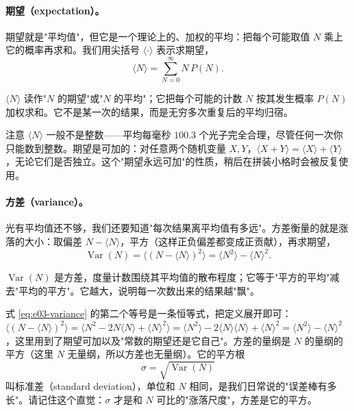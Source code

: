 \paragraph{期望（expectation）。}
期望就是"平均值"，但它是一个理论上的、加权的平均：把每个可能取值 $N$ 乘上它的概率再求和。我们用尖括号 $\langle\cdot\rangle$ 表示求期望，
\begin{equation}
  \langle N\rangle=\sum_{N=0}^{\infty}N\,P(N).
  \label{eq:e03-expectation}
\end{equation}
\begin{formulaexplain}
$\langle N\rangle$ 读作"$N$ 的期望"或"$N$ 的平均"；它把每个可能的计数 $N$ 按其发生概率 $P(N)$ 加权求和。它不是某一次的结果，而是无穷多次重复后的平均归宿。
\end{formulaexplain}
注意 $\langle N\rangle$ 一般不是整数——平均每毫秒 $100.3$ 个光子完全合理，尽管任何一次你只能数到整数。期望是可加的：对任意两个随机变量 $X,Y$，$\langle X+Y\rangle=\langle X\rangle+\langle Y\rangle$，无论它们是否独立。这个"期望永远可加"的性质，稍后在拼装小格时会被反复使用。

\paragraph{方差（variance）。}
光有平均值还不够，我们还要知道"每次结果离平均值有多远"。方差衡量的就是涨落的大小：取偏差 $N-\langle N\rangle$，平方（这样正负偏差都变成正贡献），再求期望，
\begin{equation}
  \operatorname{Var}(N)=\big\langle (N-\langle N\rangle)^2\big\rangle
  =\langle N^2\rangle-\langle N\rangle^2 .
  \label{eq:e03-variance}
\end{equation}
\begin{formulaexplain}
$\operatorname{Var}(N)$ 是方差，度量计数围绕其平均值的散布程度；它等于"平方的平均"减去"平均的平方"。它越大，说明每一次数出来的结果越"飘"。
\end{formulaexplain}
式 \eqref{eq:e03-variance} 的第二个等号是一条恒等式，把定义展开即可：$\langle(N-\langle N\rangle)^2\rangle=\langle N^2-2N\langle N\rangle+\langle N\rangle^2\rangle=\langle N^2\rangle-2\langle N\rangle\langle N\rangle+\langle N\rangle^2=\langle N^2\rangle-\langle N\rangle^2$，这里用到了期望可加以及"常数的期望还是它自己"。方差的量纲是 $N$ 的量纲的平方（这里 $N$ 无量纲，所以方差也无量纲）。它的平方根
\[
  \sigma=\sqrt{\operatorname{Var}(N)}
\]
叫标准差（standard deviation），单位和 $N$ 相同，是我们日常说的"误差棒有多长"。请记住这个直觉：$\sigma$ 才是和 $N$ 可比的"涨落尺度"，方差是它的平方。

